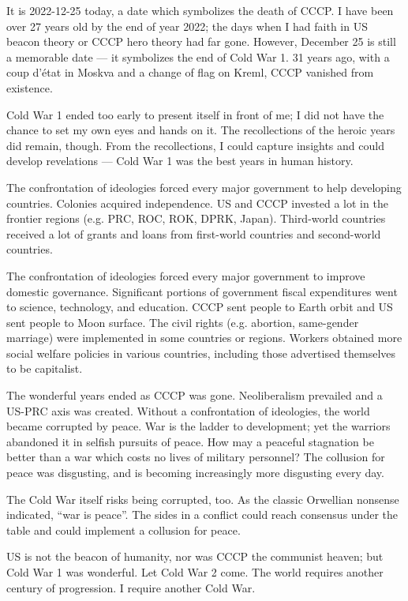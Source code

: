 
\begin{multicols*}{2}
	It is 2022-12-25 today, a date which symbolizes the death of CCCP.
	I have been over 27 years old by the end of year 2022;
	the days when I had faith in US beacon theory or CCCP hero theory had far gone.
	However, December 25 is still a memorable date --- it symbolizes the end of Cold War 1.
	31 years ago, with a coup d'\'etat in Moskva and a change of flag on Kreml, CCCP vanished from existence.

	Cold War 1 ended too early to present itself in front of me;
	I did not have the chance to set my own eyes and hands on it.
	The recollections of the heroic years did remain, though.
	From the recollections, I could capture insights and could develop revelations ---
	Cold War 1 was the best years in human history.

	The confrontation of ideologies forced every major government to help developing countries.
	Colonies acquired independence.
	US and CCCP invested a lot in the frontier regions (e.g. PRC, ROC, ROK, DPRK, Japan).
	Third-world countries received a lot of grants and loans from first-world countries and second-world countries.

	The confrontation of ideologies forced every major government to improve domestic governance.
	Significant portions of government fiscal expenditures went to science, technology, and education.
	CCCP sent people to Earth orbit and US sent people to Moon surface.
	The civil rights (e.g. abortion, same-gender marriage) were implemented in some countries or regions.
	Workers obtained more social welfare policies in various countries, including those advertised themselves to be capitalist.

	The wonderful years ended as CCCP was gone.
	Neoliberalism prevailed and a US-PRC axis was created.
	Without a confrontation of ideologies, the world became corrupted by peace.
	War is the ladder to development; yet the warriors abandoned it in selfish pursuits of peace.
	How may a peaceful stagnation be better than a war which costs no lives of military personnel?
	The collusion for peace was disgusting, and is becoming increasingly more disgusting every day.

    The Cold War itself risks being corrupted, too.
    As the classic Orwellian nonsense indicated, ``war is peace''.
    The sides in a conflict could reach consensus under the table and could implement a collusion for peace.


	US is not the beacon of humanity, nor was CCCP the communist heaven; but Cold War 1 was wonderful.
	Let Cold War 2 come.
	The world requires another century of progression.
	I require another Cold War.
\end{multicols*}
